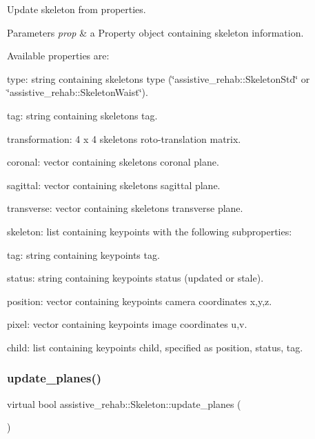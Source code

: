 Update skeleton from properties. 


\begin{DoxyParams}{Parameters}
{\em prop} & a Property object containing skeleton information.\\
\hline
\end{DoxyParams}
Available properties are\+:
\begin{DoxyItemize}
\item type\+: string containing skeleton\textquotesingle{}s type (\char`\"{}assistive\+\_\+rehab\+::\+Skeleton\+Std\char`\"{} or \char`\"{}assistive\+\_\+rehab\+::\+Skeleton\+Waist\char`\"{}).
\item tag\+: string containing skeleton\textquotesingle{}s tag.
\item transformation\+: 4 x 4 skeleton\textquotesingle{}s roto-\/translation matrix.
\item coronal\+: vector containing skeleton\textquotesingle{}s coronal plane.
\item sagittal\+: vector containing skeleton\textquotesingle{}s sagittal plane.
\item transverse\+: vector containing skeleton\textquotesingle{}s transverse plane.
\item skeleton\+: list containing keypoints with the following subproperties\+:
\begin{DoxyItemize}
\item tag\+: string containing keypoint\textquotesingle{}s tag.
\item status\+: string containing keypoint\textquotesingle{}s status (updated or stale).
\item position\+: vector containing keypoint\textquotesingle{}s camera coordinates x,y,z.
\item pixel\+: vector containing keypoint\textquotesingle{}s image coordinates u,v.
\item child\+: list containing keypoint\textquotesingle{}s child, specified as position, status, tag. 
\end{DoxyItemize}
\end{DoxyItemize}\mbox{\label{classassistive__rehab_1_1Skeleton_af0ee2be195f804a9562cb184a2be0bad}} 
\subsubsection{\texorpdfstring{update\_planes()}{update\_planes()}}
{\footnotesize\ttfamily virtual bool assistive\+\_\+rehab\+::\+Skeleton\+::update\+\_\+planes (\begin{DoxyParamCaption}{ }\end{DoxyParamCaption})\hspace{0.3cm}{\ttfamily [pure virtual]}}



